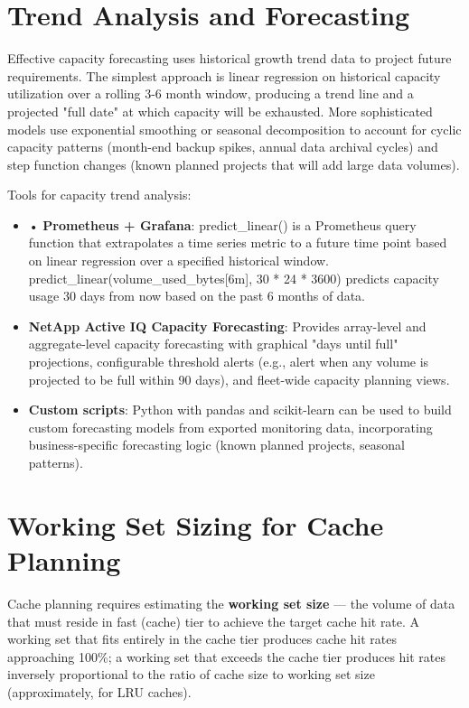 \section{Trend Analysis and Forecasting}
Effective capacity forecasting uses historical growth trend data to project future requirements. The simplest approach is linear regression on historical capacity utilization over a rolling 3-6 month window, producing a trend line and a projected "full date" at which capacity will be exhausted. More sophisticated models use exponential smoothing or seasonal decomposition to account for cyclic capacity patterns (month-end backup spikes, annual data archival cycles) and step function changes (known planned projects that will add large data volumes).

Tools for capacity trend analysis:

\begin{itemize}
  \item • \textbf{Prometheus + Grafana}: predict\_linear() is a Prometheus query function that extrapolates a time series metric to a future time point based on linear regression over a specified historical window. predict\_linear(volume\_used\_bytes{[}6m{]}, 30 * 24 * 3600) predicts capacity usage 30 days from now based on the past 6 months of data.
  \item \textbf{NetApp Active IQ Capacity Forecasting}: Provides array-level and aggregate-level capacity forecasting with graphical "days until full" projections, configurable threshold alerts (e.g., alert when any volume is projected to be full within 90 days), and fleet-wide capacity planning views.
  \item \textbf{Custom scripts}: Python with pandas and scikit-learn can be used to build custom forecasting models from exported monitoring data, incorporating business-specific forecasting logic (known planned projects, seasonal patterns).
\end{itemize}

\section{Working Set Sizing for Cache Planning}
Cache planning requires estimating the \textbf{working set size} --- the volume of data that must reside in fast (cache) tier to achieve the target cache hit rate. A working set that fits entirely in the cache tier produces cache hit rates approaching 100\%; a working set that exceeds the cache tier produces hit rates inversely proportional to the ratio of cache size to working set size (approximately, for LRU caches).

